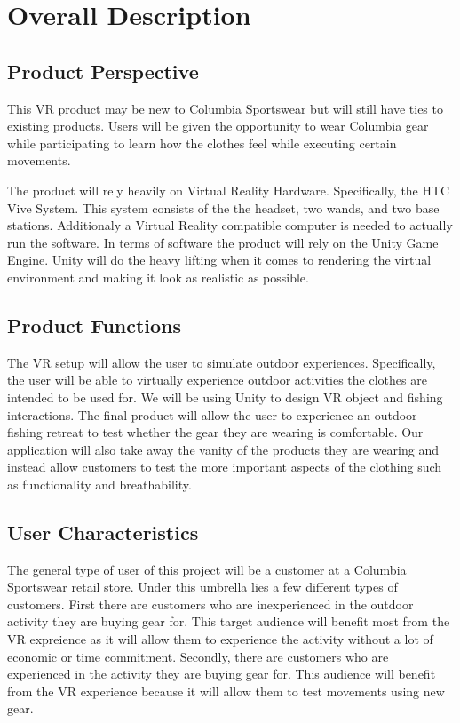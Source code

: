 \documentclass[10pt,journal,compsoc,onecolumn, draftclsnofoot]{IEEEtran}
\begin{document}
\section{Overall Description}
\subsection{Product Perspective}
This VR product may be new to Columbia Sportswear but will still have ties to
existing products. Users will be given the opportunity to
wear Columbia gear while participating to learn how the clothes feel while
executing certain movements.

The product will rely heavily on Virtual Reality Hardware. Specifically, the HTC
Vive System. This system consists of the the headset, two
wands, and two base stations. Additionaly a Virtual Reality compatible computer
is needed to actually run the software. In terms of software the
product will rely on the Unity Game Engine. Unity will do the heavy lifting
when it comes to rendering the virtual environment and making it look as realistic
as possible.

\subsection{Product Functions}
The VR setup will allow the user to simulate outdoor experiences.
Specifically, the user will be able to virtually experience outdoor activities the clothes are intended to be used for.
We will be using Unity to design VR object and fishing interactions.
The final product will allow the user to experience an outdoor fishing retreat to test whether the gear they are wearing is comfortable.
Our application will also take away the vanity of the products they are wearing and instead allow customers to test the more important aspects of the clothing such as functionality and breathability.

\subsection{User Characteristics}
The general type of user of this project will be a customer at a Columbia
Sportswear retail store. Under this umbrella lies a few different types of
customers. First there are customers who are inexperienced in the outdoor
activity they are buying gear for. This target audience will benefit most
from the VR expreience as it will allow them to experience the activity without
a lot of economic or time commitment. Secondly, there are customers who are
experienced in the activity they are buying gear for. This audience will benefit
from the VR experience because it will allow them to test movements using new gear.
\end{document}
